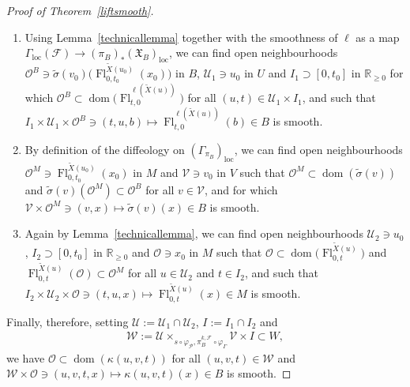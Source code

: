 \documentclass[11pt]{article}
\numberwithin{equation}{section}
\numberwithin{equation}{section}
\def\loc{\operatorname{loc}}
\def\dom{\operatorname{dom}}
\def\Fl{\operatorname{Fl}}
\def\FF{{\mathcal{F}}}
\def\WW{{\mathcal{W}}}
\def\UU{{\mathcal{U}}}
\def\VV{{\mathcal{V}}}
\def\PP{{\mathcal{P}}}
\def\OO{{\mathcal{O}}}
\def\RB{{\mathbb{R}}}
\def\XF{{\mathfrak{X}}}
\begin{document}
\begin{proof}[Proof of Theorem~\ref{liftsmooth}]
\begin{enumerate}\itemsep=0pt
\item Using Lemma~\ref{technicallemma} together with the smoothness of $\ell$ as a map $\Gamma_{\loc}(\FF)\rightarrow(\pi_{B})_{*}(\XF_{B})_{\loc}$, we can find open neighbourhoods $\OO^{B}\ni\tilde{\sigma}(v_{0})\big(\Fl^{\tilde{X}(u_{0})}_{0,t_{0}}(x_{0})\big)$ in $B$, $\UU_{1}\ni u_{0}$ in $U$ and $I_{1}\supset[0,t_{0}]$ in $\RB_{\geq0}$ for which $\OO^{B}\subset\dom\big(\Fl^{\ell(\tilde{X}(u))}_{t,0}\big)$ for all $(u,t)\in\UU_{1}\times I_{1}$, and such that $I_{1}\times\UU_{1}\times \OO^{B}\ni(t,u,b)\mapsto\Fl^{\ell(\tilde{X}(u))}_{t,0}(b)\in B$ is smooth.
\item By definition of the diffeology on $(\Gamma_{\pi_{B}})_{\loc}$, we can find open neighbourhoods $\OO^{M}\ni\Fl^{\tilde{X}(u_{0})}_{0,t_{0}}(x_{0})$ in $M$ and $\VV\ni v_{0}$ in $V$ such that $\OO^{M}\subset\dom(\tilde{\sigma}(v))$ and $\tilde{\sigma}(v)(\OO^{M})\subset\OO^{B}$ for all $v\in\VV$, and for which $\VV\times\OO^{M}\ni(v,x)\mapsto\tilde{\sigma}(v)(x)\in B$ is smooth.
\item Again by Lemma~\ref{technicallemma}, we can find open neighbourhoods $\UU_{2}\ni u_{0}$, $I_{2}\supset[0,t_{0}]$ in $\RB_{\geq0}$ and $\OO\ni x_{0}$ in $M$ such that $\OO\subset\dom\big(\Fl^{\tilde{X}(u)}_{0,t}\big)$ and $\Fl^{\tilde{X}(u)}_{0,t}(\OO)\subset\OO^{M}$ for all $u\in\UU_{2}$ and $t\in I_{2}$, and such that $I_{2}\times\UU_{2}\times \OO\ni(t,u,x)\mapsto\Fl^{\tilde{X}(u)}_{0,t}(x)\in M$ is smooth.
\end{enumerate}
Finally, therefore, setting $\UU:=\UU_{1}\cap\UU_{2}$, $I:=I_{1}\cap I_{2}$ and
\begin{gather*}
\WW:=\UU\times_{s\circ\varphi_{\PP},\pi_{B}^{k,\FF}\circ\varphi_{\Gamma}}\VV\times I\subset W,
\end{gather*}
we have $\OO\subset\dom(\kappa(u,v,t))$ for all $(u,v,t)\in\WW$ and $\WW\times\OO\ni(u,v,t,x)\mapsto\kappa(u,v,t)(x)\in B$ is smooth.
\end{proof}
\end{document}
